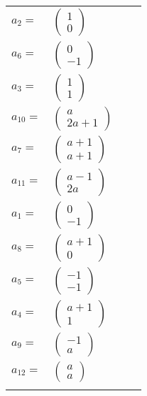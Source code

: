 \documentclass[1p]{elsarticle_modified}
\theoremstyle{definition}
\begin{document}
\begin{tabular}{m{7pt} m{180pt} m{7pt} m{180pt} }
\flushright $a_{2}=$&$\begin{pmatrix}1\\0\end{pmatrix}$ \\
\flushright $a_{6}=$&$\begin{pmatrix}0\\-1\end{pmatrix}$ \\
\flushright $a_{3}=$&$\begin{pmatrix}1\\1\end{pmatrix}$ \\
\flushright $a_{10}=$&$\begin{pmatrix}a\\2 a+1\end{pmatrix}$ \\
\flushright $a_{7}=$&$\begin{pmatrix}a+1\\a+1\end{pmatrix}$ \\
\flushright $a_{11}=$&$\begin{pmatrix}a-1\\2 a\end{pmatrix}$ \\
\flushright $a_{1}=$&$\begin{pmatrix}0\\-1\end{pmatrix}$ \\
\flushright $a_{8}=$&$\begin{pmatrix}a+1\\0\end{pmatrix}$ \\
\flushright $a_{5}=$&$\begin{pmatrix}-1\\-1\end{pmatrix}$ \\
\flushright $a_{4}=$&$\begin{pmatrix}a+1\\1\end{pmatrix}$ \\
\flushright $a_{9}=$&$\begin{pmatrix}-1\\a\end{pmatrix}$ \\
\flushright $a_{12}=$&$\begin{pmatrix}a\\a\end{pmatrix}$\\&\end{tabular}
\end{document}
